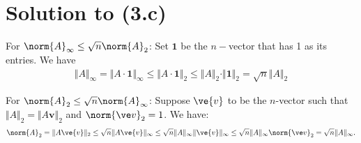 \documentclass[11pt,letterpaper]{article}
\begin{document}
\section{Solution to (3.c)}

For $\norm{A}_\infty\leq \sqrt{n}\norm{A}_2$: Set $\mathbf{1}$ be the $n-$vector that has 1 as its entries. We have
\begin{align*}
\Vert A\Vert_\infty = \Vert A\cdot\mathbf{1}\Vert_\infty \leq \Vert A\cdot\mathbf{1}\Vert_2 \leq \Vert A\Vert_2\cdot\Vert\mathbf{1}\Vert_2 = \sqrt{n}\Vert A\Vert_2
\end{align*}

For $\norm{A}_2\leq \sqrt{n}\norm{A}_\infty$: Suppose $\ve{v}$ to be the $n$-vector such that $\Vert A \Vert_2 = \Vert A \mathbf{v}\Vert_2$ and $\norm{\ve v}_2 = 1$. We have:
\begin{align*}
\norm{A}_2 = \Vert A \ve{v}\Vert_2 \leq \sqrt{n}\Vert A \ve{v}\Vert_\infty \leq \sqrt{n}\Vert A\Vert_\infty\Vert \ve{v} \Vert_\infty \leq \sqrt{n}\Vert A\Vert_\infty\norm{\ve v}_2 = \sqrt{n}\Vert A\Vert_\infty.
\end{align*}
\end{document}

